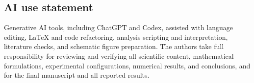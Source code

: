 \documentclass{article}
\begin{document}
\subsection*{AI use statement}
Generative AI tools, including ChatGPT and Codex, assisted with language editing,
LaTeX and code refactoring, analysis scripting and interpretation, literature
checks, and schematic figure preparation.
The authors take full responsibility for reviewing and verifying all scientific
content, mathematical formulations, experimental configurations, numerical
results, and conclusions, and for the final manuscript and all reported results.




\appendix





\FloatBarrier

\FloatBarrier

\FloatBarrier

\clearpage

\end{document}
